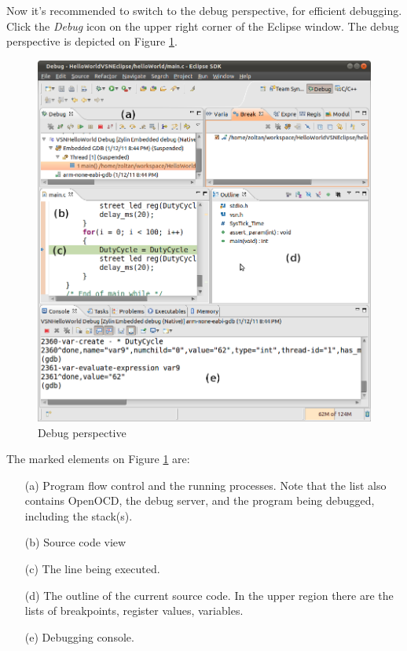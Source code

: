 \documentclass[a4paper, 10pt]{article}
\begin{document}
Now it's recommended to switch to the debug perspective,
for efficient debugging.
Click the \emph{Debug} icon on the upper right corner of the Eclipse window.
The debug perspective is depicted on Figure \ref{fig:debug-window}.


    \begin{figure}[H]
    \centering
        \includegraphics[width=\textwidth]{./png-install-guide/debug-window.png}
        \caption{Debug perspective}
        \label{fig:debug-window}
    \end{figure}

The marked elements on Figure \ref{fig:debug-window} are:
    \begin{itemize}
    \item[(a)] Program flow control and the running processes.
        Note that the list also contains OpenOCD, the debug server,
        and the program being debugged, including the stack(s).
    \item[(b)] Source code view
    \item[(c)] The line being executed.
    \item[(d)] The outline of the current source code.
        In the upper region there are the lists of breakpoints, register values,
        variables.
    \item[(e)] Debugging console.
    \end{itemize}
\end{document}
